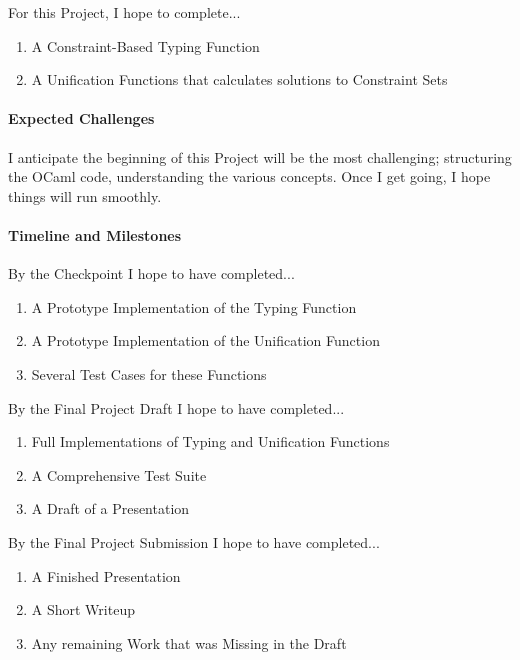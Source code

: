 \documentclass{article}
\begin{document}
For this Project, I hope to complete...
\begin{enumerate}
\item A Constraint-Based Typing Function
\item A Unification Functions that calculates solutions to Constraint Sets
\end{enumerate}

\paragraph{Expected Challenges}

I anticipate the beginning of this Project will be the most challenging; structuring the OCaml code, 
understanding the various concepts. Once I get going, I hope things will run smoothly.

\paragraph{Timeline and Milestones} \noindent
By the Checkpoint I hope to have completed...
\begin{enumerate}
\item A Prototype Implementation of the Typing Function
\item A Prototype Implementation of the Unification Function
\item Several Test Cases for these Functions
\end{enumerate}

\noindent
By the Final Project Draft I hope to have completed...
\begin{enumerate}
\item Full Implementations of Typing and Unification Functions
\item A Comprehensive Test Suite
\item A Draft of a Presentation
\end{enumerate}

\noindent
By the Final Project Submission I hope to have completed...
\begin{enumerate}
\item A Finished Presentation
\item A Short Writeup
\item Any remaining Work that was Missing in the Draft
\end{enumerate}
\end{document}
